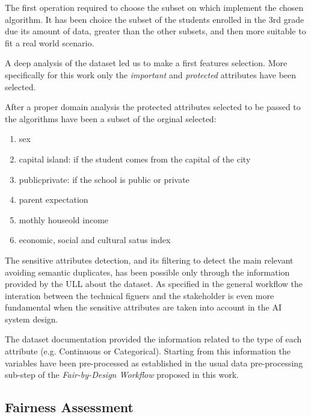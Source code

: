 \documentclass[12pt,a4paper,openright,twoside]{book}
\begin{document}
The first operation required to choose the subset on which implement the chosen algorithm. It has been choice the subset of the students enrolled in the 3rd grade due its amount of data, greater than the other subsets, and then more suitable to fit a real world scenario.

A deep analysis of the dataset led us to make a first features selection. More specifically for this work only the \emph{important} and \emph{protected} attributes have been selected.

After a proper domain analysis the protected attributes selected to be passed to the algorithms have been a subset of the orginal selected:

\begin{enumerate}

    \item sex

    \item capital island: if the student comes from the capital of the city

    \item public\textunderscore private: if the school is public or private

    \item parent expectation
    
    \item mothly houseold income

    \item economic, social and cultural satus index

\end{enumerate}

The sensitive attributes detection, and its filtering to detect the main relevant avoiding semantic duplicates, has been possible only through the information provided by the ULL about the dataset. As specified in the general workflow the interation between the technical figuers and the stakeholder is even more fundamental when the sensitive attributes are taken into account in the AI system design.

The dataset documentation provided the information related to the type of each attribute (e.g. Continuous or Categorical). Starting from this information the variables have been pre-processed as established in the usual data pre-processing sub-step of the \emph{Fair-by-Design Workflow} proposed in this work.

\subsection{Fairness Assessment}
\end{document}
